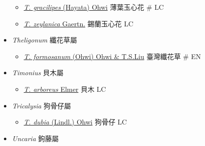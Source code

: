 \begin{itemize}
  \begin{itemize}
        \item[] \href{http://www.theplantlist.org/tpl1.1/search?q=Tarenna+gracilipes}{\textit{T. gracilipes} (Hayata) Ohwi}   薄葉玉心花  \# LC
        \item[] \href{http://www.theplantlist.org/tpl1.1/search?q=Tarenna+zeylanica}{\textit{T. zeylanica} Gaertn.}   錫蘭玉心花   LC
  \end{itemize}
 \item[] \textit{Theligonum} 纖花草屬
                                
  \begin{itemize}
        \item[] \href{http://www.theplantlist.org/tpl1.1/search?q=Theligonum+formosanum}{\textit{T. formosanum} (Ohwi) Ohwi \& T.S.Liu}   臺灣纖花草  \# EN
  \end{itemize}
 \item[] \textit{Timonius} 貝木屬
                                
  \begin{itemize}
        \item[] \href{http://www.theplantlist.org/tpl1.1/search?q=Timonius+arboreus}{\textit{T. arboreus} Elmer}   貝木   LC
  \end{itemize}
 \item[] \textit{Tricalysia} 狗骨仔屬
                                
  \begin{itemize}
        \item[] \href{http://www.theplantlist.org/tpl1.1/search?q=Tricalysia+dubia}{\textit{T. dubia} (Lindl.) Ohwi}   狗骨仔   LC
  \end{itemize}
 \item[] \textit{Uncaria} 鉤藤屬
                                

\end{itemize}
